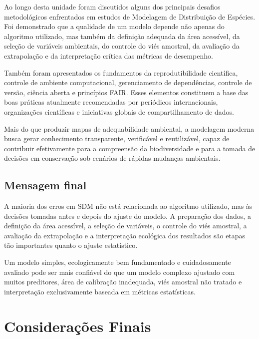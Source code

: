 \documentclass{ueap-sdm}
\begin{document}
Ao longo desta unidade foram discutidos alguns dos principais desafios
metodológicos enfrentados em estudos de Modelagem de Distribuição de Espécies.
Foi demonstrado que a qualidade de um modelo depende não apenas do algoritmo
utilizado, mas também da definição adequada da área acessível, da seleção de
variáveis ambientais, do controle do viés amostral, da avaliação da
extrapolação e da interpretação crítica das métricas de desempenho.

Também foram apresentados os fundamentos da reprodutibilidade científica,
controle de ambiente computacional, gerenciamento de dependências, controle de
versão, ciência aberta e princípios FAIR. Esses elementos constituem a base das
boas práticas atualmente recomendadas por periódicos internacionais,
organizações científicas e iniciativas globais de compartilhamento de dados.

Mais do que produzir mapas de adequabilidade ambiental, a modelagem moderna
busca gerar conhecimento transparente, verificável e reutilizável, capaz de
contribuir efetivamente para a compreensão da biodiversidade e para a tomada de
decisões em conservação sob cenários de rápidas mudanças ambientais.

\section{Mensagem final}

A maioria dos erros em SDM não está relacionada ao algoritmo utilizado, mas às
decisões tomadas antes e depois do ajuste do modelo. A preparação dos dados, a
definição da área acessível, a seleção de variáveis, o controle do viés
amostral, a avaliação da extrapolação e a interpretação ecológica dos
resultados são etapas tão importantes quanto o ajuste estatístico.

\begin{sdmkeybox}
	Um modelo simples, ecologicamente bem fundamentado e cuidadosamente avaliado
	pode ser mais confiável do que um modelo complexo ajustado com muitos
	preditores, área de calibração inadequada, viés amostral não tratado e
	interpretação exclusivamente baseada em métricas estatísticas.
\end{sdmkeybox}

\chapter[Considerações finais]{Considerações Finais}
\end{document}
